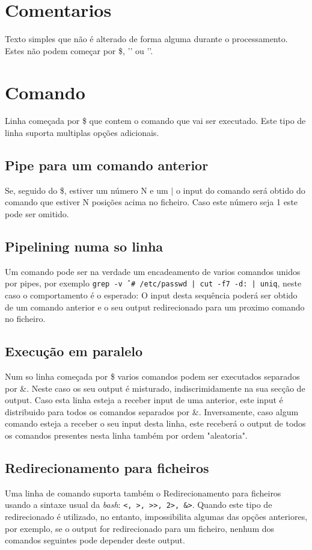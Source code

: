 \documentclass[12pt,a4paper]{report}
\begin{document}
    \section{Comentarios}
        Texto simples que não é alterado de forma alguma durante o
        processamento. Estes não podem começar por \$, '\outputStart' ou
        '\outputEnd'.
    \section{Comando}
        Linha começada por \$ que contem o comando que vai ser executado.
        Este tipo de linha suporta multiplas opções adicionais.
        \subsection{Pipe para um comando anterior}
            Se, seguido do \$, estiver um número N e um $|$ o input do comando
            será obtido do comando que estiver N posições acima no ficheiro.
            Caso este número seja 1 este pode ser omitido.
        \subsection{Pipelining numa so linha}
            Um comando pode ser na verdade um encadeamento de varios comandos
            unidos por pipes, por exemplo
            \texttt{grep -v ˆ# /etc/passwd | cut -f7 -d: | uniq},
            neste caso o comportamento é o esperado: O input desta sequência
            poderá ser obtido de um comando anterior e o seu output
            redirecionado para um proximo comando no ficheiro.
        \subsection{Execução em paralelo}
            Num so linha começada por \$ varios comandos podem ser executados
            separados por \&. Neste caso os seu output é misturado,
            indiscrimidamente na sua secção de output. Caso esta linha esteja
            a receber input de uma anterior, este input é distribuido para
            todos os comandos separados por \&. Inversamente, caso algum
            comando esteja a receber o seu input desta linha, este receberá
            o output de todos os comandos presentes nesta linha também por
            ordem "aleatoria".
        \subsection{Redirecionamento para ficheiros}
            Uma linha de comando suporta também o Redirecionamento para
            ficheiros usando a sintaxe usual da \textit{bash}:
            \texttt{<, >, >>, 2>, &>}.
            Quando este tipo de redirecionado é utilizado, no entanto,
            impossibilita algumas das opções anteriores, por exemplo,
            se o output for redirecionado para um ficheiro, nenhum dos comandos
            seguintes pode depender deste output.
\end{document}
